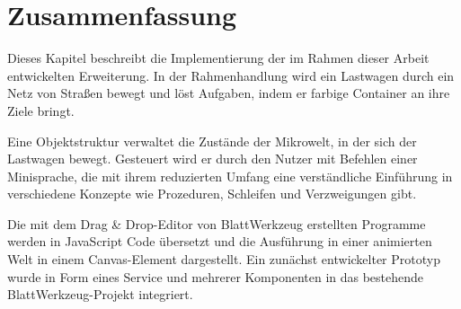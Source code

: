 \section{Zusammenfassung}
\label{sec:implementation:summary}

Dieses Kapitel beschreibt die Implementierung der im Rahmen dieser Arbeit entwickelten Erweiterung. In der Rahmenhandlung wird ein Lastwagen durch ein Netz von Straßen bewegt und löst Aufgaben, indem er farbige Container an ihre Ziele bringt.

Eine Objektstruktur verwaltet die Zustände der Mikrowelt, in der sich der Lastwagen bewegt. Gesteuert wird er durch den Nutzer mit Befehlen einer Minisprache, die mit ihrem reduzierten Umfang eine verständliche Einführung in verschiedene Konzepte wie Prozeduren, Schleifen und Verzweigungen gibt.

Die mit dem Drag \& Drop-Editor von BlattWerkzeug erstellten Programme werden in JavaScript Code übersetzt und die Ausführung in einer animierten Welt in einem Canvas-Element dargestellt. Ein zunächst entwickelter Prototyp wurde in Form eines Service und mehrerer Komponenten in das bestehende BlattWerkzeug-Projekt integriert.
